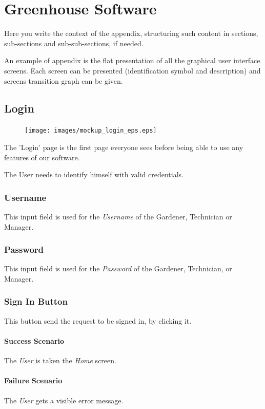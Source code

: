\chapter{Greenhouse Software}
\label{chap:appendix}


Here you write the context of the appendix, structuring such content in
sections, sub-sections and sub-sub-sections, if needed.

An example of appendix is the flat presentation of all the graphical user interface screens.
Each screen can be presented (identification symbol and description) and screens transition graph can be given.


\section{Login}
\label{sec:appendix_Login}
\begin{figure}
\texttt{[image: images/mockup\_login\_eps.eps]}
\end{figure}

The 'Login' page is the first page everyone sees before being able to use any
features of our software.

The User needs to identify himself with valid credentials.

\subsection{Username}
This input field is used for the \emph{Username} of the Gardener, Technician or
Manager.

\subsection{Password}
This input field is used for the \emph{Password} of the Gardener, Technician, or
Manager.

\subsection{Sign In Button}
This button send the request to be signed in, by clicking it.

\subsubsection{Success Scenario}
The \emph{User} is taken the \emph{Home} screen.

\subsubsection{Failure Scenario}
The \emph{User} gets a visible error message.






